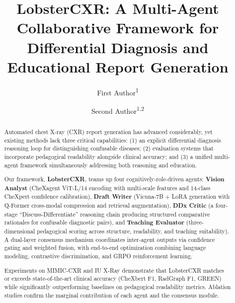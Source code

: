\documentclass[runningheads,10pt]{llncs}
\begin{document}
\title{LobsterCXR: A Multi-Agent Collaborative Framework for Differential Diagnosis and Educational Report Generation}

\author{First Author\textsuperscript{1} \and Second Author\textsuperscript{1,2}}

\maketitle

\begin{abstract}
Automated chest X-ray (CXR) report generation has advanced considerably, yet existing methods lack three critical capabilities: (1) an explicit differential diagnosis reasoning loop for distinguishing confusable diseases; (2) evaluation systems that incorporate pedagogical readability alongside clinical accuracy; and (3) a unified multi-agent framework simultaneously addressing both reasoning and education.

Our framework, \textbf{LobsterCXR}, teams up four cognitively-role-driven agents: \textbf{Vision Analyst} (CheXagent ViT-L/14 encoding with multi-scale features and 14-class CheXpert confidence calibration), \textbf{Draft Writer} (Vicuna-7B + LoRA generation with Q-Former cross-modal compression and retrieval augmentation), \textbf{DDx Critic} (a four-stage ``Discuss-Differentiate'' reasoning chain producing structured comparative rationales for confusable diagnostic pairs), and \textbf{Teaching Evaluator} (three-dimensional pedagogical scoring across structure, readability, and teaching suitability). A dual-layer consensus mechanism coordinates inter-agent outputs via confidence gating and weighted fusion, with end-to-end optimization combining language modeling, contrastive discrimination, and GRPO reinforcement learning.

Experiments on MIMIC-CXR and IU X-Ray demonstrate that LobsterCXR matches or exceeds state-of-the-art clinical accuracy (CheXbert F1, RadGraph F1, GREEN) while significantly outperforming baselines on pedagogical readability metrics. Ablation studies confirm the marginal contribution of each agent and the consensus module.

\end{abstract}
\end{document}
